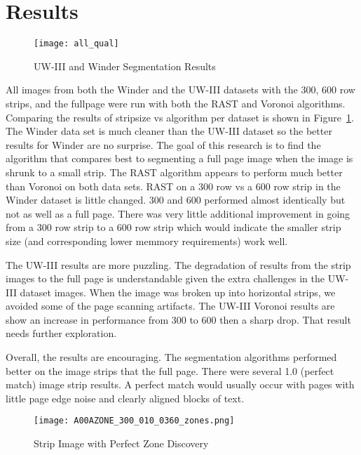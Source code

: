 \documentclass[conference]{IEEEtran}
\begin{document}
\section{Results}

\begin{figure}[all-qualitative]
\texttt{[image: all\_qual]}
\caption{UW-III and Winder Segmentation Results}
\label{fig:all-qualitative}
\end{figure}

All images from both the Winder and the UW-III datasets with 
the 300, 600 row strips, and the fullpage were run with both the RAST and
Voronoi algorithms. Comparing the results of stripsize vs algorithm per dataset
is shown in Figure~\ref{fig:all-qualitative}. The Winder data set is much
cleaner than the UW-III dataset so the better results for Winder are no
surprise. The goal of this research is to find the algorithm that compares best
to segmenting a full page image when the image is shrunk to a small strip. The
RAST algorithm appears to perform much better than Voronoi on both data sets.
RAST on a 300 row vs a 600 row strip in the Winder dataset is little changed.
300 and 600 performed almost identically but not as well as a full page. There
was very little additional improvement in going from a 300 row strip to a 600
row strip which would indicate the smaller strip size (and corresponding lower
memmory requirements) work well.

The UW-III results are more puzzling. The degradation of results from the
strip images to the full page is understandable given the extra challenges in
the UW-III dataset images. When the image was broken up into horizontal strips,
we avoided some of the page scanning artifacts. The UW-III Voronoi results are
show an increase in performance from 300 to 600 then a sharp drop. That result
needs further exploration.

Overall, the results are encouraging. The segmentation algorithms performed
better on the image strips that the full page. There were several 1.0 (perfect
match) image strip results. A perfect match would usually occur with
pages with little page edge noise and clearly aligned blocks of text.  

\begin{figure}[strip-image-showing-perfect-hit]
\texttt{[image: A00AZONE\_300\_010\_0360\_zones.png]}
\caption{Strip Image with Perfect Zone Discovery}
\label{fig:strip-image-showing-perfect-hit}
\end{figure}
\end{document}
